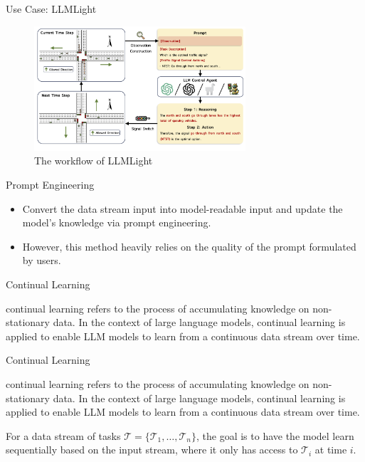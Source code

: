 \documentclass[t]{beamer}
\begin{document}
\begin{frame}{Use Case: LLMLight}
  \begin{figure}
    \centering
    \includegraphics[width=0.7\textwidth]{LLMLight.PNG}
    \caption{The workflow of LLMLight \cite{Lai23}}
    \label{fig:llmlight}
\end{figure}
\end{frame}

\begin{frame}{Prompt Engineering}
  \vspace{1cm}
  \begin{itemize}
    \item Convert the data stream input into model-readable input and update the model’s knowledge via prompt engineering.
    \item However, this method heavily relies on the quality of the prompt formulated by users.
  \end{itemize}
\end{frame}

\begin{frame}{Continual Learning}
  \vspace{1cm}
  \begin{Definition}
    continual learning refers to the process of accumulating knowledge on non-stationary data. In the context of large language models, continual learning is applied to enable LLM models
to learn from a continuous data stream over time. \cite{Biesi20}
  \end{Definition}
\end{frame}
\begin{frame}{Continual Learning}
  \vspace{1cm}
  \begin{Definition}
    continual learning refers to the process of accumulating knowledge on non-stationary data. In the context of large language models, continual learning is applied to enable LLM models
to learn from a continuous data stream over time. \cite{Biesi20}
  \end{Definition}
  \vspace{1cm}
  \begin{Definition}
    For a data stream of tasks $\mathcal{T}= \{\mathcal{T}_1,\ldots,\mathcal{T}_n \}$, the goal is to
have the model learn sequentially based on the input stream, where it only has access to $\mathcal{T}_i$ at time $i$. \cite{Wu24}
  \end{Definition}
\end{frame}
\end{document}
